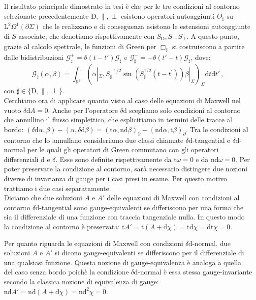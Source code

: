 \documentclass[11pt,a4paper]{article}
\begin{document}
	Il risultato principale dimostrato in tesi è che per le tre condizioni al contorno selezionate precedentemente $\mathrm{D},\parallel,\perp$ esistono operatori autoaggiunti $\Theta_\sharp$ su $\mathrm{L}^2\Omega^1(\partial\Sigma)$ che le realizzano e di conseguenza esistono le estensioni autoaggiunte di $S$ associate, che denotiamo rispettivamente con $S_{\mathrm{D}}, S_\parallel, S_\perp$. A questo punto, grazie al calcolo spettrale, le funzioni di Green per $\Box_\sharp$ si costruiscono a partire dalle bidistribuzioni $\mathcal{G}_\sharp^+=\theta(t-t')\mathcal{G}_\sharp$ e $\mathcal{G}_\sharp^-=-\theta(t'-t)\mathcal{G}_\sharp$, dove: $$\mathcal{G}_\sharp(\alpha,\beta)=
	\int_{\mathbb{R}^2}
	\left(\alpha|_{\Sigma},S^{-1/2}_{\sharp}\sin(S^{1/2}_{\sharp}(t-t^\prime))\beta|_{\Sigma}\right)_{\Sigma}
	\mathrm{d}t\mathrm{d}t'\,,$$
	con $\sharp\in\{\mathrm{D},\parallel,\perp\}$.\\
	
	Cerchiamo ora di applicare quanto visto al caso delle equazioni di Maxwell nel vuoto $\delta\mathrm{d}A=0$. Anche per l'operatore $\delta\mathrm{d}$ scegliamo solo condizioni al contorno che annullino il flusso simplettico, che esplicitiamo in termini delle tracce al bordo:
	$(\delta\mathrm{d}\alpha,\beta)-(\alpha,\delta\mathrm{d}\beta)=
	(\mathrm{t}\alpha,\mathrm{n}\mathrm{d}\beta)_\partial
	-(\mathrm{n}\mathrm{d}\alpha,\mathrm{t}\beta)_\partial$. Tra le condizioni al contorno che lo annullano consideriamo due classi chiamate $\delta\mathrm{d}$-tangential e $\delta\mathrm{d}$-normal per le quali gli operatori di Green commutano con gli operatori differenziali $\mathrm{d}$ e $\delta$. Esse sono definite rispettivamente da $\mathrm{t}\omega=0$ e da $\mathrm{n}\mathrm{d}\omega=0$. Per poter preservare la condizione al contorno, sarà necessario distingere due nozioni diverse di invarianza di gauge per i casi presi in esame. Per questo motivo trattiamo i due casi separatamente.\\
	
	Diciamo che due soluzioni $A$ e $A'$ delle equazioni di Maxwell con condizioni al contorno $\delta\mathrm{d}$-tangential sono gauge-equivalenti se differiscono per una forma che sia il differenziale di una funzione con traccia tangenziale nulla. In questo modo la condizione al contorno è preservata: $\mathrm{t}A'=\mathrm{t}(A+\mathrm{d}\chi)=\mathrm{t}\mathrm{d}\chi=\mathrm{d}\mathrm{t}\chi=0$.
	
	Per quanto riguarda le equazioni di Maxwell con condizioni $\delta\mathrm{d}$-normal, due soluzioni $A$ e $A'$ si dicono gauge-equivalenti se differiscono per il differenziale di una qualsiasi funzione. Questa nozione di gauge-equivalenza è analoga a quella del caso senza bordo poichè la condizione $\delta\mathrm{d}$-normal è essa stessa gauge-invariante secondo la classica nozione di equivalenza di gauge: $\mathrm{nd}A'=\mathrm{nd}(A+\mathrm{d}\chi)=\mathrm{nd}^2\chi=0$.
	
\end{document}
